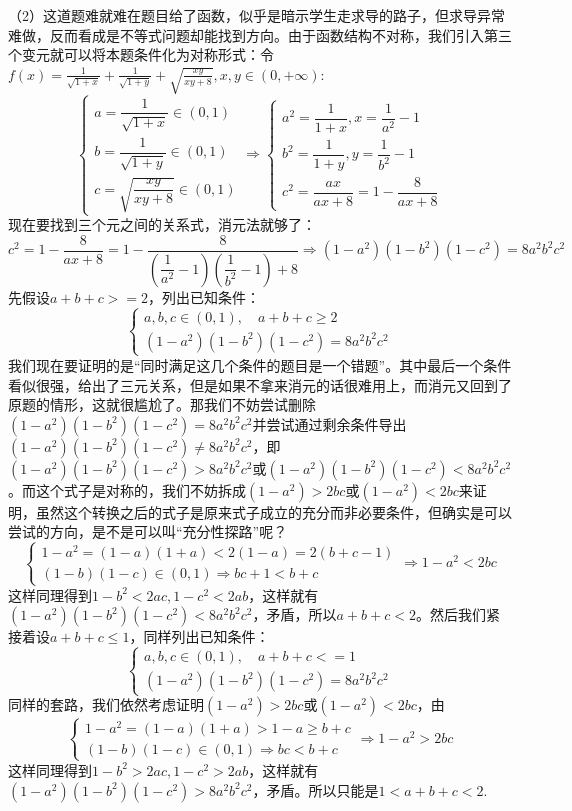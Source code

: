 \begin{solution}
    （2）这道题难就难在题目给了函数，似乎是暗示学生走求导的路子，但求导异常难做，反而看成是不等式问题却能找到方向。由于函数结构不对称，我们引入第三个变元就可以将本题条件化为对称形式：令$f \left( x \right)= \frac{1}{ \sqrt{1+x}}+ \frac{1}{ \sqrt{1+y}}+ \sqrt{ \frac{xy}{xy+8}},x,y \in \left( 0,+ \infty \right)$:
    \[
    \begin{cases}a=\dfrac{1}{\sqrt{1+x}}\in(0,1)\\b=\dfrac{1}{ \sqrt{1+y}}\in(0,1)\\c=\sqrt{ \dfrac{xy}{xy+8}}\in(0,1)\end{cases}\Rightarrow 
    \begin{cases}a^2=\dfrac{1}{1+x},x=\dfrac{1}{a^2}-1\\[1.2ex]b^2=\dfrac{1}{1+y},y=\dfrac{1}{b^2}-1\\[1.2ex]c^2=\dfrac{ax}{ax+8}=1-\dfrac{8}{ax+8}\end{cases}
    \]
现在要找到三个元之间的关系式，消元法就够了：
\[
c^2=1-\dfrac{8}{ax+8}=1-\dfrac{8}{(\dfrac{1}{a^2}-1)(\dfrac{1}{b^2}-1)+8}\Rightarrow (1-a^2)(1-b^2)(1-c^2)=8a^2b^2c^2
\]先假设$a+b+c>=2$，列出已知条件：
\[\begin{cases}a,b,c\in(0,1),\quad a+b+c\geq 2\\(1-a^2)(1-b^2)(1-c^2)=8a^2b^2c^2\end{cases}\]
我们现在要证明的是“同时满足这几个条件的题目是一个错题”。其中最后一个条件看似很强，给出了三元关系，但是如果不拿来消元的话很难用上，而消元又回到了原题的情形，这就很尴尬了。那我们不妨尝试删除$(1-a^2)(1-b^2)(1-c^2)=8a^2b^2c^2$并尝试通过剩余条件导出$(1-a^2)(1-b^2)(1-c^2)\ne8a^2b^2c^2$，即$(1-a^2)(1-b^2)(1-c^2)>8a^2b^2c^2$或$(1-a^2)(1-b^2)(1-c^2)<8a^2b^2c^2$。而这个式子是对称的，我们不妨拆成$(1-a^2)>2bc$或$(1-a^2)<2bc$来证明，虽然这个转换之后的式子是原来式子成立的充分而非必要条件，但确实是可以尝试的方向，是不是可以叫“充分性探路”呢？
\[\begin{cases}1-a^2=(1-a)(1+a)<2(1-a)=2(b+c-1)\\(1-b)(1-c)\in(0,1)\Rightarrow bc+1<b+c\end{cases}\Rightarrow 1-a^2<2bc\]
这样同理得到$1-b^2<2ac,1-c^2<2ab$，这样就有$(1-a^2)(1-b^2)(1-c^2)<8a^2b^2c^2$，矛盾，所以$a+b+c<2$。然后我们紧接着设$a+b+c\leq 1$，同样列出已知条件：
\[\begin{cases}a,b,c\in(0,1),\quad a+b+c<=1\\(1-a^2)(1-b^2)(1-c^2)=8a^2b^2c^2\end{cases}\]
同样的套路，我们依然考虑证明$(1-a^2)>2bc$或$(1-a^2)<2bc$，由
\[\begin{cases}1-a^2=(1-a)(1+a)>1-a\geq b+c\\(1-b)(1-c)\in(0,1)\Rightarrow bc<b+c\end{cases}\Rightarrow 1-a^2>2bc\]
这样同理得到$1-b^2>2ac,1-c^2>2ab$，这样就有$(1-a^2)(1-b^2)(1-c^2)>8a^2b^2c^2$，矛盾。所以只能是$1<a+b+c<2$.


\end{solution}
